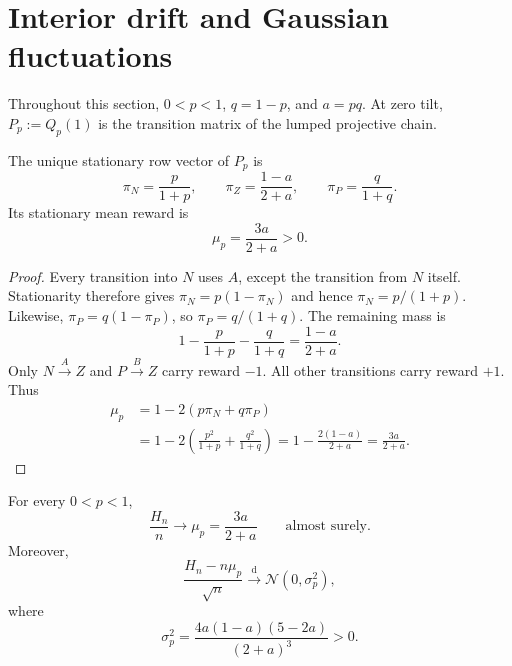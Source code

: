 \section{Interior drift and Gaussian fluctuations}
\label{sec:limits}

Throughout this section, $0<p<1$, $q=1-p$, and $a=pq$.  At zero tilt,
$P_p:=Q_p(1)$ is the transition matrix of the lumped projective chain.

\begin{lemma}
\label{lem:stationary}
The unique stationary row vector of $P_p$ is
\begin{equation}
 \label{eq:stationary}
 \boxed{\quad
 \pi_N=\frac{p}{1+p},\qquad
 \pi_Z=\frac{1-a}{2+a},\qquad
 \pi_P=\frac{q}{1+q}.
 \quad}
\end{equation}
Its stationary mean reward is
\begin{equation}
 \label{eq:drift}
 \boxed{\quad \mu_p=\frac{3a}{2+a}>0.\quad}
\end{equation}
\end{lemma}

\begin{proof}
Every transition into $N$ uses $A$, except the transition from $N$ itself.
Stationarity therefore gives $\pi_N=p(1-\pi_N)$ and hence
$\pi_N=p/(1+p)$.  Likewise, $\pi_P=q(1-\pi_P)$, so
$\pi_P=q/(1+q)$.  The remaining mass is
\[
 1-\frac{p}{1+p}-\frac{q}{1+q}=\frac{1-a}{2+a}.
\]
Only $N\xrightarrow{A}Z$ and $P\xrightarrow{B}Z$ carry reward $-1$.
All other transitions carry reward $+1$.  Thus
\begin{align*}
 \mu_p
 &=1-2(p\pi_N+q\pi_P)\\
 &=1-2\left(\frac{p^2}{1+p}+\frac{q^2}{1+q}\right)
 =1-\frac{2(1-a)}{2+a}=\frac{3a}{2+a}.
\end{align*}
\end{proof}

\begin{theorem}
\label{thm:slln-clt}
For every $0<p<1$,
\begin{equation}
 \label{eq:slln}
 \frac{H_n}{n}\longrightarrow\mu_p=\frac{3a}{2+a}
 \qquad\text{almost surely}.
\end{equation}
Moreover,
\begin{equation}
 \label{eq:clt}
 \frac{H_n-n\mu_p}{\sqrt n}
 \xrightarrow{\mathrm d}\mathcal N(0,\sigma_p^2),
\end{equation}
where
\begin{equation}
 \label{eq:variance}
 \boxed{\quad
 \sigma_p^2=
 \frac{4a(1-a)(5-2a)}{(2+a)^3}>0.
 \quad}
\end{equation}
\end{theorem}

